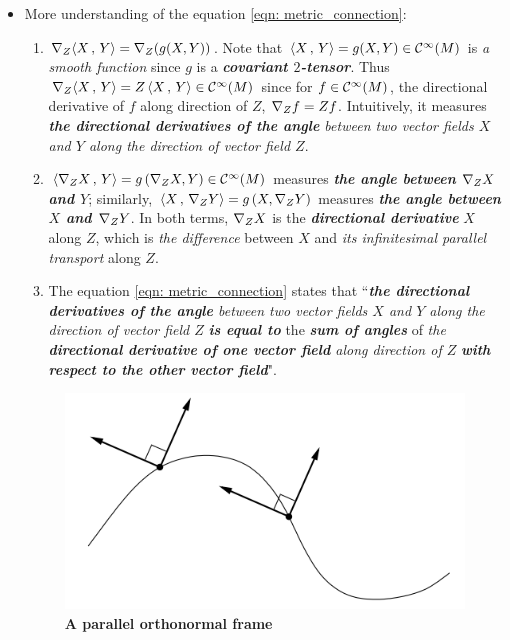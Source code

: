 \documentclass[11pt]{article}
\begin{document}
\begin{itemize}
\item \begin{remark} More understanding of the equation \eqref{eqn: metric_connection}:
\begin{enumerate}
\item $\nabla_{Z}{\left\langle X\,,\, Y \right\rangle} = \nabla_{Z}{(g(X, Y))}$. Note that $\left\langle X\,,\, Y \right\rangle = g(X, Y) \in {\mathcal C}^{\infty}(M)$ is \emph{a smooth function} since $g$ is a \emph{\textbf{covariant $2$-tensor}}.  Thus $\nabla_{Z}{\left\langle X\,,\, Y \right\rangle} = Z\left\langle X\,,\, Y \right\rangle \in {\mathcal C}^{\infty}(M)$ since for $f \in {\mathcal C}^{\infty}(M)$, the directional derivative of $f$ along direction of $Z$, $\nabla_{Z}{f} = Zf$. Intuitively, it measures \emph{\textbf{the directional derivatives of the angle} between two vector fields $X$ and $Y$ along the direction of vector field $Z$}.

\item $\left\langle \nabla_{Z}{X}\,,\, Y \right\rangle = g\left(\nabla_{Z}{X}, Y\right) \in {\mathcal C}^{\infty}(M)$ measures \emph{\textbf{the angle between $\nabla_{Z}{X}$ and $Y$}}; similarly, $\left\langle X\,,\, \nabla_{Z}{Y} \right\rangle = g\left(X, \nabla_{Z}{Y}\right)$ measures \emph{\textbf{the angle between $X$ and $\nabla_{Z}{Y}$}}. In both terms,  $\nabla_{Z}{X}$ is the \emph{\textbf{directional derivative}} $X$ along $Z$, which is \emph{the difference} between $X$ and \emph{its infinitesimal parallel transport} along $Z$. 

\item The equation \eqref{eqn: metric_connection} states that  ``\emph{\textbf{the directional derivatives of the angle} between two vector fields $X$ and $Y$ along the direction of vector field $Z$} \emph{\textbf{is equal to}} the \emph{\textbf{sum of angles}} of \emph{the \textbf{directional derivative of one vector field} along direction of $Z$} \emph{\textbf{with respect to the other vector field}}".
\end{enumerate}
\end{remark}

\begin{figure}
\begin{minipage}[htb]{1\linewidth}
  \centering
  \centerline{\includegraphics[scale = 0.5]{parallel_orthonormal_frame.png}}
\end{minipage}
\caption{\footnotesize{\textbf{A parallel orthonormal frame \citep{lee2018introduction}}}}
\label{fig: parallel_orthonormal_frame}
\end{figure}


\end{itemize}
\end{document}
